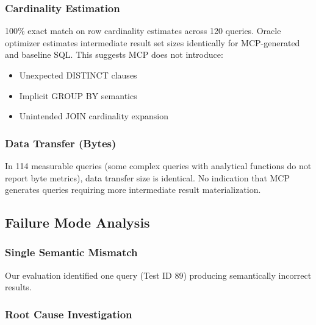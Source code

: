 \subsubsection{Cardinality Estimation}

100\% exact match on row cardinality estimates across 120 queries. Oracle optimizer estimates intermediate result set sizes identically for MCP-generated and baseline SQL. This suggests MCP does not introduce:
\begin{itemize}
    \item Unexpected DISTINCT clauses
    \item Implicit GROUP BY semantics
    \item Unintended JOIN cardinality expansion
\end{itemize}

\subsubsection{Data Transfer (Bytes)}

In 114 measurable queries (some complex queries with analytical functions do not report byte metrics), data transfer size is identical. No indication that MCP generates queries requiring more intermediate result materialization.













\subsection{Failure Mode Analysis}

\subsubsection{Single Semantic Mismatch}

Our evaluation identified one query (Test ID 89) producing semantically incorrect results.



\subsubsection{Root Cause Investigation}

